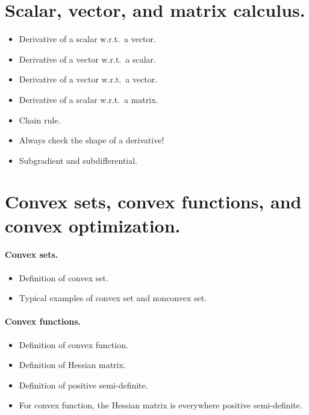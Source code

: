 \documentclass[11pt]{article}
\numberwithin{equation}{section}
\begin{document}
\section{Scalar, vector, and matrix calculus.}

\begin{itemize}
	\item 
	Derivative of a scalar w.r.t.\ a vector.
	\item
	Derivative of a vector w.r.t.\ a scalar.
	\item
	Derivative of a vector w.r.t.\ a vector.
	\item
	Derivative of a scalar w.r.t.\ a matrix.
	\item
	Chain rule.
	\item
	Always check the shape of a derivative!
	\item
	Subgradient and subdifferential.
\end{itemize}




\section{Convex sets, convex functions, and convex optimization.}


\paragraph{Convex sets.}

\begin{itemize}
	\item 
	Definition of convex set.
	\item
	Typical examples of convex set and nonconvex set.
\end{itemize}




\paragraph{Convex functions.}

\begin{itemize}
	\item
	Definition of convex function.
	\item
	Definition of Hessian matrix. 
	\item
	Definition of positive semi-definite.
	\item
	For convex function, the Hessian matrix is everywhere positive semi-definite.
\end{itemize}
\end{document}
